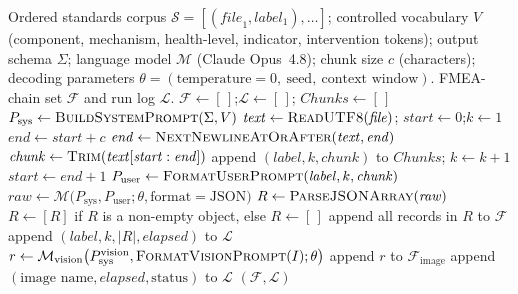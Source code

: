 \documentclass[preprint,12pt,authoryear]{elsarticle}
\begin{document}
\begin{algorithm}[H]
\caption{Schema-guided FMEA-chain extraction with optional vision perception.}
\label{alg:fmea}
\begin{algorithmic}[1]
\Require Ordered standards corpus
  $\mathcal{S}=[(\mathit{file}_1,\mathit{label}_1),\dots]$;
  controlled vocabulary $V$ (component, mechanism, health-level, indicator,
  intervention tokens); output schema $\Sigma$; language model $\mathcal{M}$
  (Claude Opus~4.8); chunk size $c$ (characters); decoding parameters
  $\theta=(\text{temperature}=0,\ \text{seed},\ \text{context window})$.
\Ensure FMEA-chain set $\mathcal{F}$ and run log $\mathcal{L}$.
\State $\mathcal{F}\gets[\,]$;\quad $\mathcal{L}\gets[\,]$;\quad
  $\mathit{Chunks}\gets[\,]$
\State $P_{\text{sys}}\gets \Call{BuildSystemPrompt}{\Sigma,V}$
  \State $\mathit{text}\gets\Call{ReadUTF8}{\mathit{file}}$;\quad
    $\mathit{start}\gets 0$;\quad $k\gets 1$
    \State $\mathit{end}\gets \mathit{start}+c$
      \State $\mathit{end}\gets\Call{NextNewlineAtOrAfter}{\mathit{text},\mathit{end}}$
    \EndIf
    \State $\mathit{chunk}\gets\Call{Trim}{\mathit{text}[\mathit{start}:\mathit{end}]}$
      \State append $(\mathit{label},k,\mathit{chunk})$ to $\mathit{Chunks}$;\quad
        $k\gets k+1$
    \EndIf
    \State $\mathit{start}\gets \mathit{end}+1$
  \EndWhile
\EndFor
{}
  \State $P_{\text{user}}\gets\Call{FormatUserPrompt}{\mathit{label},k,\mathit{chunk}}$
  \State $\mathit{raw}\gets\mathcal{M}\bigl(P_{\text{sys}},P_{\text{user}};
    \theta,\text{format}=\text{JSON}\bigr)$
  \State $R\gets\Call{ParseJSONArray}{\mathit{raw}}$
    \State $R\gets[R]$ if $R$ is a non-empty object, else $R\gets[\,]$
  \EndIf
  \State append all records in $R$ to $\mathcal{F}$
  \State append $(\mathit{label},k,|R|,\mathit{elapsed})$ to $\mathcal{L}$
\EndFor
{}
    \State $r\gets\mathcal{M}_{\text{vision}}\bigl(P_{\text{sys}}^{\text{vision}},
      \Call{FormatVisionPrompt}{I};\theta\bigr)$
      \State append $r$ to $\mathcal{F}_{\text{image}}$
    \EndIf
    \State append $(\text{image name},\mathit{elapsed},\text{status})$ to $\mathcal{L}$
  \EndFor
\EndIf
\State {}
\State \Return $(\mathcal{F},\mathcal{L})$
\end{algorithmic}
\end{algorithm}
\end{document}
